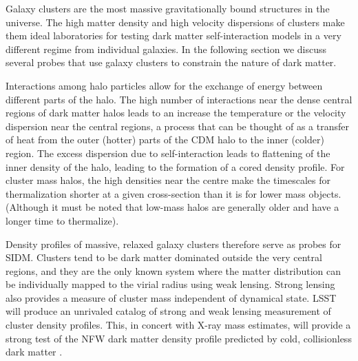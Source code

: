 
Galaxy clusters are the most massive gravitationally bound structures in the universe. The high matter density and high velocity dispersions of clusters make them ideal laboratories for testing dark matter self-interaction models in a very different regime from individual galaxies.
In the following section we discuss several probes that use galaxy clusters to constrain the nature of dark matter.

\vspace{1em} 



Interactions among halo particles allow for the exchange of energy between different parts of the halo. The high number of interactions near the dense central regions of dark matter halos leads to an increase the temperature or the velocity dispersion near the central regions, a process that can be thought of as a transfer of heat from the outer (hotter) parts of the CDM halo to the inner (colder) region. The excess dispersion due to self-interaction leads to flattening of the inner density of the halo, leading to the formation of a cored density profile. For cluster mass halos, the high densities near the centre make the timescales for thermalization shorter at a given cross-section than it is for lower mass objects. (Although it must be noted that low-mass halos are generally older and have a longer time to thermalize).

Density profiles of massive, relaxed galaxy clusters therefore serve as probes for SIDM. Clusters tend to be dark matter dominated outside the very central regions, and they are the only known system where the matter distribution can be individually mapped to the virial radius using weak lensing. Strong lensing also provides a measure of cluster mass independent of dynamical state. LSST will produce an unrivaled catalog of strong and weak lensing measurement of cluster density profiles. This, in concert with X-ray mass estimates, will provide a strong test of the NFW dark matter density profile predicted by cold, collisionless dark matter \citep{Newman:2013}. 

